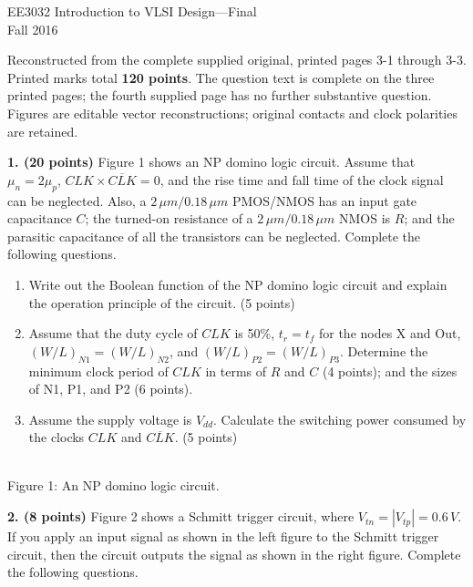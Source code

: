 \documentclass[10pt]{article}
\newcommand{\mos}[4]{\begin{scope}[shift={(#1,#2)}]
\draw(0,.24)--(0,-.24);\draw(0,.2)--(.25,.2)--(.25,.5);\draw(0,-.2)--(.25,-.2)--(.25,-.5);
\draw(-.16,.23)--(-.16,-.23);
\ifnum#4=1\draw(-.26,0)circle(.06);\draw(-.75,0)--(-.32,0);\else\draw(-.75,0)--(-.16,0);\fi
\node[anchor=east,font=\scriptsize]at(-.76,0){$#3$};\end{scope}}
\newcommand{\gnd}[2]{\draw(#1,#2)--(#1,{#2-.12});\draw({#1-.17},{#2-.12})--({#1+.17},{#2-.12});\draw({#1-.11},{#2-.2})--({#1+.11},{#2-.2});}
\newcommand{\rail}[3]{\draw(#1,#2)--(#1,{#2+.14});\node[above,font=\scriptsize]at(#1,{#2+.14}){$#3$};}
\begin{document}
\begin{center}{\Large EE3032 Introduction to VLSI Design---Final}\\Fall 2016\end{center}
Reconstructed from the complete supplied original, printed pages 3-1 through 3-3. Printed marks total \textbf{120 points}. The question text is complete on the three printed pages; the fourth supplied page has no further substantive question. Figures are editable vector reconstructions; original contacts and clock polarities are retained.
\par\medskip
\textbf{1. (20 points)} Figure 1 shows an NP domino logic circuit. Assume that $\mu_n=2\mu_p$, $CLK\times\overline{CLK}=0$, and the rise time and fall time of the clock signal can be neglected. Also, a $2\,\mu m/0.18\,\mu m$ PMOS/NMOS has an input gate capacitance $C$; the turned-on resistance of a $2\,\mu m/0.18\,\mu m$ NMOS is $R$; and the parasitic capacitance of all the transistors can be neglected. Complete the following questions.
\begin{enumerate}[label=(\alph*)]
\item Write out the Boolean function of the NP domino logic circuit and explain the operation principle of the circuit. (5 points)
\item Assume that the duty cycle of $CLK$ is 50\%, $t_r=t_f$ for the nodes X and Out, $(W/L)_{N1}=(W/L)_{N2}$, and $(W/L)_{P2}=(W/L)_{P3}$. Determine the minimum clock period of $CLK$ in terms of $R$ and $C$ (4 points); and the sizes of N1, P1, and P2 (6 points).
\item Assume the supply voltage is $V_{dd}$. Calculate the switching power consumed by the clocks $CLK$ and $\overline{CLK}$. (5 points)
\end{enumerate}\begin{center}\\Figure 1: An NP domino logic circuit.\end{center}\newpage\textbf{2. (8 points)} Figure 2 shows a Schmitt trigger circuit, where $V_{tn}=|V_{tp}|=0.6\,V$. If you apply an input signal as shown in the left figure to the Schmitt trigger circuit, then the circuit outputs the signal as shown in the right figure. Complete the following questions.
\end{document}
